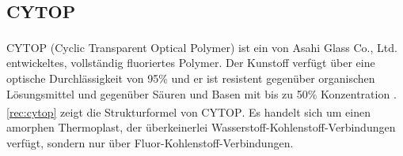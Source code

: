 \subsection{CYTOP\textsuperscript{\texttrademark}}
\label{subsec:pofcytop}

CYTOP\textsuperscript{\texttrademark} (Cyclic Transparent Optical Polymer) ist
ein von Asahi Glass Co., Ltd. entwickeltes, vollständig fluoriertes Polymer. Der
Kunstoff verfügt über eine optische Durchlässigkeit von 95\% und er ist
resistent gegenüber organischen Lösungsmittel und gegenüber Säuren und Basen mit
bis zu 50\% Konzentration \cite{pofagc}. \autoref{rec:cytop} zeigt die
Strukturformel von CYTOP\textsuperscript{\texttrademark}. Es handelt sich um
einen amorphen Thermoplast, der überkeinerlei
Wasserstoff-Kohlenstoff-Verbindungen verfügt, sondern nur über
Fluor-Kohlenstoff-Verbindungen.

